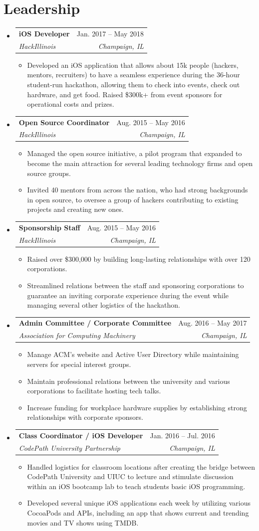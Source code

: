 \documentclass[letterpaper,11pt]{article}
\makeatletter
\newcommand{\resumeItem}[1]{\item\small{#1 \vspace{-2pt}}}
\newcommand{\resumeSubheading}[4]{%
  \vspace{-2pt}\item
    \begin{tabular*}{0.97\textwidth}[t]{l@{\extracolsep{\fill}}r}
      \textbf{#1} & #2 \\
      \textit{\small#3} & \textit{\small #4} \\
    \end{tabular*}\vspace{-7pt}
}
\newcommand{\resumeSubHeadingListStart}{\begin{itemize}[leftmargin=0.15in, label={}]}
\newcommand{\resumeSubHeadingListEnd}{\end{itemize}}
\newcommand{\resumeItemListStart}{\begin{itemize}}
\newcommand{\resumeItemListEnd}{\end{itemize}\vspace{-5pt}}
\makeatother
\begin{document}
\section{Leadership}
  \resumeSubHeadingListStart
    \resumeSubheading
      {iOS Developer}{Jan. 2017 -- May 2018}
      {HackIllinois}{Champaign, IL}
      \resumeItemListStart
        \resumeItem{Developed an iOS application that allows about 15k people (hackers, mentors, recruiters) to have a seamless experience during the 36-hour student-run hackathon, allowing them to check into events, check out hardware, and get food. Raised \$300k+ from event sponsors for operational costs and prizes.}
      \resumeItemListEnd
    \resumeSubheading
      {Open Source Coordinator}{Aug. 2015 -- May 2016}
      {HackIllinois}{Champaign, IL}
      \resumeItemListStart
        \resumeItem{Managed the open source initiative, a pilot program that expanded to become the main attraction for several leading technology firms and open source groups.}
        \resumeItem{Invited 40 mentors from across the nation, who had strong backgrounds in open source, to oversee a group of hackers contributing to existing projects and creating new ones.}
      \resumeItemListEnd
    \resumeSubheading
      {Sponsorship Staff}{Aug. 2015 -- May 2016}
      {HackIllinois}{Champaign, IL}
      \resumeItemListStart
        \resumeItem{Raised over \$300,000 by building long-lasting relationships with over 120 corporations.}
        \resumeItem{Streamlined relations between the staff and sponsoring corporations to guarantee an inviting corporate experience during the event while managing several other logistics of the hackathon.}
      \resumeItemListEnd
    \resumeSubheading
      {Admin Committee / Corporate Committee}{Aug. 2016 -- May 2017}
      {Association for Computing Machinery}{Champaign, IL}
      \resumeItemListStart
        \resumeItem{Manage ACM's website and Active User Directory while maintaining servers for special interest groups.}
        \resumeItem{Maintain professional relations between the university and various corporations to facilitate hosting tech talks.}
        \resumeItem{Increase funding for workplace hardware supplies by establishing strong relationships with corporate sponsors.}
      \resumeItemListEnd
    \resumeSubheading
      {Class Coordinator / iOS Developer}{Jan. 2016 -- Jul. 2016}
      {CodePath University Partnership}{Champaign, IL}
      \resumeItemListStart
        \resumeItem{Handled logistics for classroom locations after creating the bridge between CodePath University and UIUC to lecture and stimulate discussion within an iOS bootcamp lab to teach students basic iOS programming.}
        \resumeItem{Developed several unique iOS applications each week by utilizing various CocoaPods and APIs, including an app that shows current and trending movies and TV shows using TMDB.}
      \resumeItemListEnd
  \resumeSubHeadingListEnd
\end{document}
